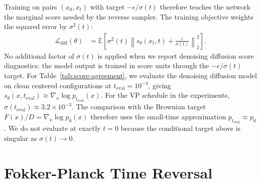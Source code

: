 \documentclass[reprint,amsmath,amssymb,aps,pra,10pt]{revtex4-2}
\begin{document}
Training on pairs $(x_0,x_t)$ with target $-\epsilon/\sigma(t)$ therefore teaches the network the marginal score needed by the reverse sampler.
The training objective weights the squared error by $\sigma^2(t)$:
\begin{equation}
    \begin{aligned}
        \mathcal{L}_{\mathrm{diff}}(\theta)
        &=
        \mathbb{E}
        \left[
            \sigma^2(t)
            \left\|
                s_\theta(x_t,t)
                +
                \frac{\epsilon}{\sigma(t)}
            \right\|_2^2
        \right].
    \end{aligned}
\end{equation}
No additional factor of $\sigma(t)$ is applied when we report denoising diffusion score diagnostics: the model output is trained in score units through the $-\epsilon/\sigma(t)$ target.
For Table~\ref{tab:score-agreement}, we evaluate the denoising diffusion model on clean centered configurations at $t_{\mathrm{eval}}=10^{-4}$, giving $s_\theta(x,t_{\mathrm{eval}})\approx\nabla_x\log p_{t_{\mathrm{eval}}}(x)$.
For the VP schedule in the experiments, $\sigma(t_{\mathrm{eval}})\approx 3.2\times10^{-3}$.
The comparison with the Brownian target $F(x)/D=\nabla_x\log p_0(x)$ therefore uses the small-time approximation $p_{t_{\mathrm{eval}}}\approx p_0$.
We do not evaluate at exactly $t=0$ because the conditional target above is singular as $\sigma(t)\to0$.

\section{Fokker-Planck Time Reversal}
\end{document}

